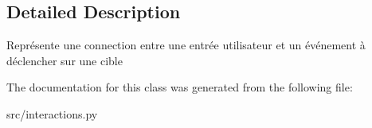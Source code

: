 \subsection{\-Detailed \-Description}
\begin{DoxyVerb}Représente une connection entre une entrée utilisateur 
    et un événement à déclencher sur une cible \end{DoxyVerb}
 

\-The documentation for this class was generated from the following file\-:\begin{DoxyCompactItemize}
\item 
src/interactions.\-py\end{DoxyCompactItemize}
